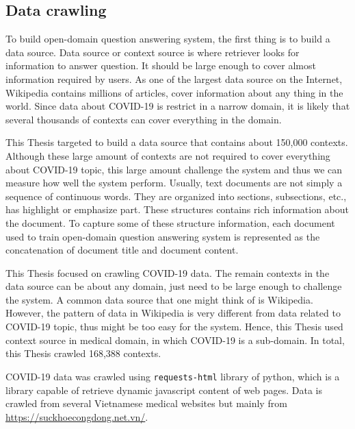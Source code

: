 \documentclass[12pt, sort&compress]{report}
\begin{document}
\subsection{Data crawling}
\label{3.3.1}
To build open-domain question answering system, the first thing is to build a data source. Data source or context source is where retriever looks for information to answer question. It should be large enough to cover almost information required by users. As one of the largest data source on the Internet, Wikipedia contains millions of articles, cover information about any thing in the world. Since data about COVID-19 is restrict in a narrow domain, it is likely that several thousands of contexts can cover everything in the domain.
\par 
\par This Thesis targeted to build a data source that contains about 150,000 contexts. Although these large amount of contexts are not required to cover everything about COVID-19 topic, this large amount challenge the system and thus we can measure how well the system perform. Usually, text documents are not simply a sequence of continuous words. They are organized into sections, subsections, etc., has highlight or emphasize part. These structures contains rich information about the document. To capture some of these structure information, each document used to train open-domain question answering system is represented as the concatenation of document title and document content.
\par
\par This Thesis focused on crawling COVID-19 data. The remain contexts in the data source can be about any domain, just need to be large enough to challenge the system. A common data source that one might think of is Wikipedia. However, the pattern of data in Wikipedia is very different from data related to COVID-19 topic, thus might be too easy for the system. Hence, this Thesis used context source in medical domain, in which COVID-19 is a sub-domain. In total, this Thesis crawled 168,388 contexts.
\par COVID-19 data was crawled using {\tt requests-html} library of python, which is a library capable of retrieve dynamic javascript content of web pages. Data is crawled from several Vietnamese medical websites but mainly from \url{https://suckhoecongdong.net.vn/}.
\end{document}

